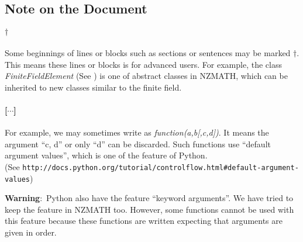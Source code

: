  \subsection{Note on the Document}
   \paragraph{$\dagger$}
   Some beginnings of lines or blocks such as sections or sentences
    may be marked $\dagger$.
   This means these lines or blocks is for advanced users.
   For example, the class \textit{FiniteFieldElement} %
   (See ) is %
   one of abstract classes in NZMATH, %
   which can be inherited to new classes similar to the finite field.
   \paragraph{[$\cdots$]}
   For example, we may sometimes write as \textit{function(a,b[,c,d])}. 
   It means the argument ``c, d'' or only ``d'' can be discarded.
   Such functions use ``default argument values'', 
   which is one of the feature of Python.\\
   (See 
   \verb+http://docs.python.org/tutorial/controlflow.html#default-argument-values+)
   
   \textbf{Warning}:\ Python also have the feature ``keyword arguments''.
   We have tried to keep the feature in NZMATH too.
   However, some functions cannot be used with this feature 
   because these functions are written 
   expecting that arguments are given in order.



